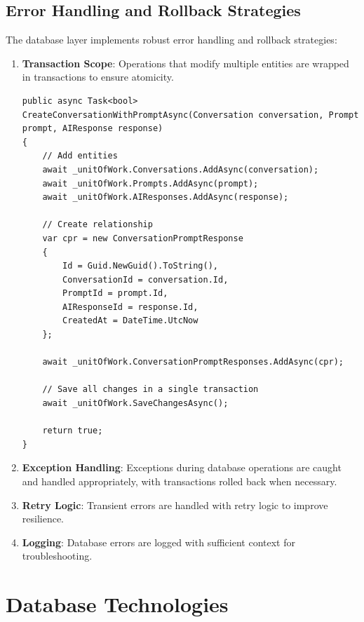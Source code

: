 \subsection{Error Handling and Rollback Strategies}

The database layer implements robust error handling and rollback strategies:

\begin{enumerate}
   \item \textbf{Transaction Scope}: Operations that modify multiple entities are wrapped in transactions to ensure atomicity.

\begin{verbatim}
public async Task<bool> CreateConversationWithPromptAsync(Conversation conversation, Prompt prompt, AIResponse response)
{
    // Add entities
    await _unitOfWork.Conversations.AddAsync(conversation);
    await _unitOfWork.Prompts.AddAsync(prompt);
    await _unitOfWork.AIResponses.AddAsync(response);
    
    // Create relationship
    var cpr = new ConversationPromptResponse
    {
        Id = Guid.NewGuid().ToString(),
        ConversationId = conversation.Id,
        PromptId = prompt.Id,
        AIResponseId = response.Id,
        CreatedAt = DateTime.UtcNow
    };
    
    await _unitOfWork.ConversationPromptResponses.AddAsync(cpr);
    
    // Save all changes in a single transaction
    await _unitOfWork.SaveChangesAsync();
    
    return true;
}
\end{verbatim}

   \item \textbf{Exception Handling}: Exceptions during database operations are caught and handled appropriately, with transactions rolled back when necessary.

   \item \textbf{Retry Logic}: Transient errors are handled with retry logic to improve resilience.

   \item \textbf{Logging}: Database errors are logged with sufficient context for troubleshooting.
\end{enumerate}

\section{Database Technologies}

